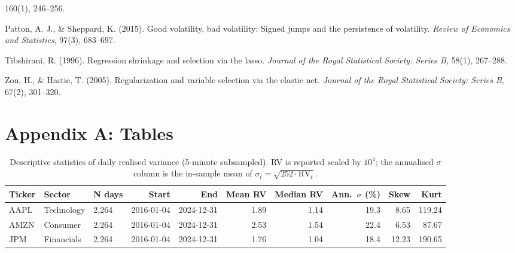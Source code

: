 \documentclass[twocolumn,9pt]{extarticle}
\begin{document}
160(1), 246--256.\par
Patton, A. J., \& Sheppard, K. (2015). Good volatility, bad
volatility: Signed jumps and the persistence of volatility.
\textit{Review of Economics and Statistics}, 97(3), 683--697.\par
Tibshirani, R. (1996). Regression shrinkage and selection via the
lasso. \textit{Journal of the Royal Statistical Society: Series B},
58(1), 267--288.\par
Zou, H., \& Hastie, T. (2005). Regularization and variable
selection via the elastic net. \textit{Journal of the Royal
Statistical Society: Series B}, 67(2), 301--320.\par
\endgroup

\clearpage
\appendix
\setlength{\floatsep}{4pt plus 1pt minus 1pt}
\setlength{\textfloatsep}{6pt plus 1pt minus 1pt}
\setlength{\intextsep}{4pt plus 1pt minus 1pt}
\setlength{\abovecaptionskip}{2pt}
\setlength{\belowcaptionskip}{2pt}

\section*{Appendix A: Tables}

\begin{table}[H]
\centering\small
\caption{Descriptive statistics of daily realised variance
(5-minute subsampled). RV is reported scaled by $10^{4}$; the
annualised $\sigma$ column is the in-sample mean of
$\sigma_t=\sqrt{252\cdot\mathrm{RV}_t}$.}
\label{tab:desc}
\begin{tabular}{lllrrrrrrr}
\toprule
Ticker & Sector & N days & Start & End & Mean RV & Median RV & Ann.\ $\sigma$ (\%) & Skew & Kurt \\
\midrule
AAPL & Technology & 2{,}264 & 2016-01-04 & 2024-12-31 & 1.89 & 1.14 & 19.3 & 8.65 & 119.24 \\
AMZN & Consumer   & 2{,}264 & 2016-01-04 & 2024-12-31 & 2.53 & 1.54 & 22.4 & 6.53 & 87.67 \\
JPM  & Financials & 2{,}264 & 2016-01-04 & 2024-12-31 & 1.76 & 1.04 & 18.4 & 12.23 & 190.65 \\
\bottomrule
\end{tabular}
\end{table}
\end{document}
